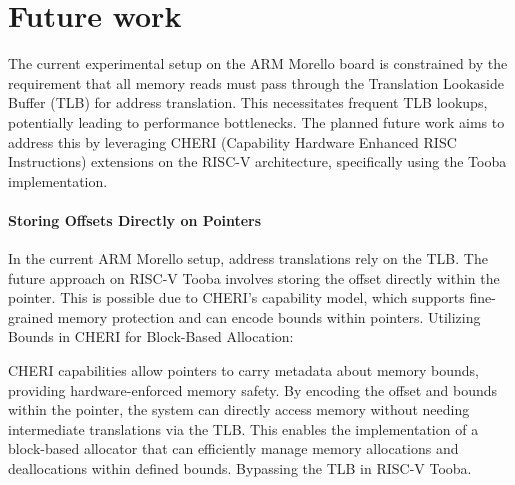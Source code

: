 \chapter{Future work}

The current experimental setup on the ARM Morello board is constrained by the requirement that all memory reads must 
pass through the Translation Lookaside Buffer (TLB) for address translation. This necessitates frequent TLB lookups, potentially 
leading to performance bottlenecks. The planned future work aims to address this by leveraging CHERI 
(Capability Hardware Enhanced RISC Instructions) extensions on the RISC-V architecture, specifically using the 
Tooba implementation.

\subsubsection{Storing Offsets Directly on Pointers}
In the current ARM Morello setup, address translations rely on the TLB.
The future approach on RISC-V Tooba involves storing the offset directly within the pointer. This is possible due to CHERI's capability model, which supports fine-grained memory protection and can encode bounds within pointers.
Utilizing Bounds in CHERI for Block-Based Allocation:

CHERI capabilities allow pointers to carry metadata about memory bounds, providing hardware-enforced memory safety.
By encoding the offset and bounds within the pointer, the system can directly access memory without needing intermediate translations via the TLB.
This enables the implementation of a block-based allocator that can efficiently manage memory allocations and deallocations within defined bounds.
Bypassing the TLB in RISC-V Tooba.

